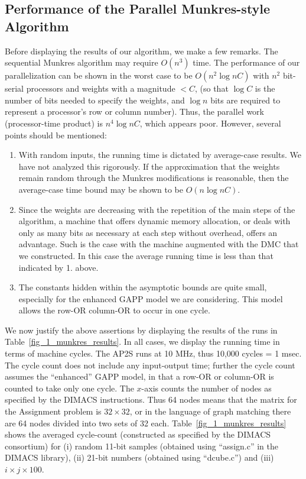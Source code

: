 \subsection{Performance of the Parallel Munkres-style Algorithm}
\label{munkres_results}

Before displaying the results of our algorithm, 
we make a few remarks.  The sequential Munkres algorithm may require $O(n^3)$ 
time.  The performance of our parallelization can be shown in the worst 
case to be $O(n^2 \log n C)$ with $n^2$ bit-serial processors and 
weights with a magnitude $< C$, (so that $\log C$ 
is the number of bits needed to specify the weights, and $\log n$ bits 
are required to represent a processor's row or column number).  
Thus, the parallel work (processor-time product) is $n^4 \log n C$, 
which appears poor.  However, several points should be mentioned:

\begin{enumerate}
\item With random inputs, the running time is dictated by average-case 
results.  We have not analyzed this rigorously.  If 
the approximation that the weights remain random through the Munkres 
modifications is reasonable, then the average-case time bound may 
be shown to be $O(n \log n C)$.

\item Since the weights are decreasing with the repetition of the 
main steps of the algorithm, a machine that offers dynamic memory 
allocation, or deals with only as many bits as necessary at each step 
without overhead, offers an advantage.  Such is the case with the 
machine augmented with the DMC that we constructed. 
In this case the average running time is less than that indicated 
by 1.  above.

\item The constants hidden within the asymptotic bounds are quite 
small, especially for the enhanced GAPP model we are considering.  
This model allows the row-OR column-OR to occur in one cycle.

\end{enumerate}

We now justify the above assertions by displaying the results of 
the runs in Table~\ref{fig_1_munkres_results}.  
In all cases, we display the 
running time in terms of machine cycles.  The AP2S runs at 10 MHz, thus 
10,000 cycles = 1 msec.  The cycle count does not include any 
input-output time; further the cycle count assumes the ``enhanced'' 
GAPP model, in that a row-OR or column-OR is counted to take only 
one cycle.  The $x$-axis counts the number of nodes as specified 
by the DIMACS instructions.  Thus 64 nodes means that the matrix 
for the Assignment problem is $32 \times 32$, or in the language 
of graph matching there are 64 nodes divided into two sets of 32 
each.  Table~\ref{fig_1_munkres_results} shows the averaged cycle-count 
(constructed as specified by the DIMACS consortium) for 
(i) random 11-bit samples (obtained using ``assign.c'' in the DIMACS library),
(ii)  21-bit numbers (obtained using ``dcube.c'') and 
(iii) $i \times j \times 100$.  

